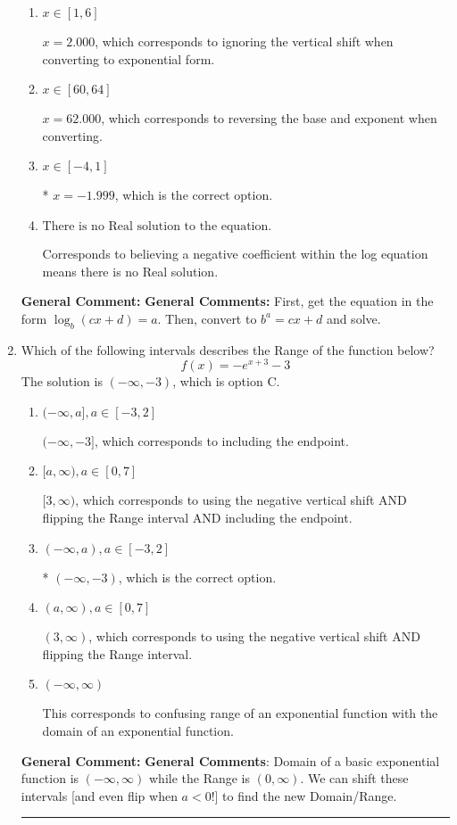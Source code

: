 \documentclass{extbook}[14pt]
\newcommand{\litem}[1]{\item #1

\rule{\textwidth}{0.4pt}}
\begin{document}
\begin{enumerate}
{\begin{enumerate}[label=\Alph*.]
$x = 66.000$, which corresponds to reversing the base and exponent when converting and reversing the value with $x$.
\item \( x \in [1, 6] \)

$x = 2.000$, which corresponds to ignoring the vertical shift when converting to exponential form.
\item \( x \in [60, 64] \)

$x = 62.000$, which corresponds to reversing the base and exponent when converting.
\item \( x \in [-4, 1] \)

* $x = -1.999$, which is the correct option.
\item \( \text{There is no Real solution to the equation.} \)

Corresponds to believing a negative coefficient within the log equation means there is no Real solution.
\end{enumerate}

\textbf{General Comment:} \textbf{General Comments:} First, get the equation in the form $\log_b{(cx+d)} = a$. Then, convert to $b^a = cx+d$ and solve.
}
\litem{
Which of the following intervals describes the Range of the function below?
\[ f(x) = -e^{x+3}-3 \]
The solution is \( (-\infty, -3) \), which is option C.\begin{enumerate}[label=\Alph*.]
\item \( (-\infty, a], a \in [-3, 2] \)

$(-\infty, -3]$, which corresponds to including the endpoint.
\item \( [a, \infty), a \in [0, 7] \)

$[3, \infty)$, which corresponds to using the negative vertical shift AND flipping the Range interval AND including the endpoint.
\item \( (-\infty, a), a \in [-3, 2] \)

* $(-\infty, -3)$, which is the correct option.
\item \( (a, \infty), a \in [0, 7] \)

$(3, \infty)$, which corresponds to using the negative vertical shift AND flipping the Range interval.
\item \( (-\infty, \infty) \)

This corresponds to confusing range of an exponential function with the domain of an exponential function.
\end{enumerate}

\textbf{General Comment:} \textbf{General Comments}: Domain of a basic exponential function is $(-\infty, \infty)$ while the Range is $(0, \infty)$. We can shift these intervals [and even flip when $a<0$!] to find the new Domain/Range.
}
\end{enumerate}
\end{document}
